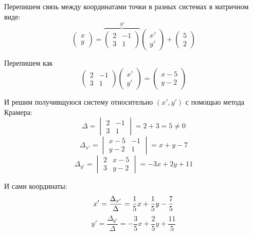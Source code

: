 \documentclass[a4paper,12pt]{article}
\begin{document}
  \begin{solution}
    Перепишем связь между координатами точки в разных системах в матричном виде:
    \begin{equation}\label{eq:problem1-x-to-x-prime}
      \begin{pmatrix}
        x\\
        y
      \end{pmatrix}
      = \overbrace{\begin{pmatrix}
        2 & -1\\
        3 & 1
      \end{pmatrix}}^{S'}
      \begin{pmatrix}
        x'\\
        y'
      \end{pmatrix}
      + \begin{pmatrix}
        5\\
        2
      \end{pmatrix}
    \end{equation}
    
    Перепишем как
    \[
      \begin{pmatrix}
        2 & -1\\
        3 & 1
      \end{pmatrix}
      \begin{pmatrix}
        x'\\
        y'
      \end{pmatrix}
      = \begin{pmatrix}
        x - 5\\
        y - 2
      \end{pmatrix}
    \]
    
    И решим получивщуюся систему относительно $(x', y')$ с помощью метода Крамера:
    \[
      \Delta = \begin{vmatrix} 2 & -1 \\ 3 & 1 \end{vmatrix} = 2 + 3 = 5 \not= 0
    \]
    \[
      \Delta_{x'} = \begin{vmatrix} x - 5 & -1 \\ y - 2 & 1 \end{vmatrix} = x + y - 7
    \]
    \[
      \Delta_{y'} = \begin{vmatrix} 2 & x - 5 \\ 3 & y - 2 \end{vmatrix} = -3x + 2y + 11
    \]
    
    И сами координаты:
    \[
      x' = \frac{\Delta_{x'}}{\Delta} = \frac{1}{5} x + \frac{1}{5} y - \frac{7}{5}\\
    \]
    \[
      y' = \frac{\Delta_{y'}}{\Delta} = -\frac{3}{5} x + \frac{2}{5} y + \frac{11}{5}
    \]
    

\end{solution}
\end{document}
